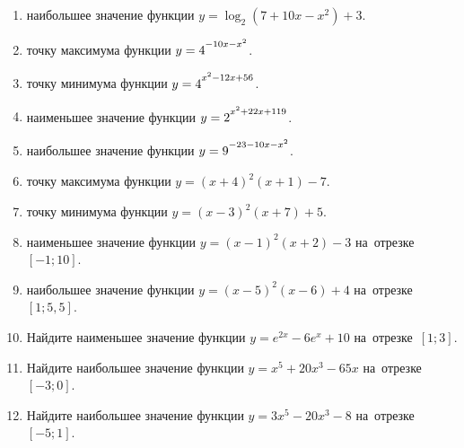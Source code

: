 \documentclass[a4paper,10pt]{article}
\begin{document}
\begin{enumerate}
\item {} наибольшее значение функции $y=\log_2\left(7+10x-x^2\right)+3$.

\item {} точку максимума функции $y=4\strut^{-10x-x^2}$.

\item {} точку минимума функции $y=4\strut^{x^2-12x+56}$.

\item {} наименьшее значение функции $y=2\strut^{x^2+22x+119}$.

\item {} наибольшее значение функции $y=9\strut^{-23-10x-x^2}$.

\item {} точку максимума функции $y=\left(x+4\right)^2\left(x+1\right)-7$.

\item {} точку минимума функции $y=\left(x-3\right)^2\left(x+7\right)+5$.

\item {} наименьшее значение функции $y=\left(x-1\right)^2\left(x+2\right)-3$ на~отрезке~$\left[-1;10\right]$.

\item {} наибольшее значение функции $y=\left(x-5\right)^2\left(x-6\right)+4$ на~отрезке~$\left[1;5{,}5\right]$.

\item Найдите наименьшее значение функции $y=e^{2x}-6e^x+10$ на~отрезке~$\left[1;3\right]$.

\item Найдите наибольшее значение функции $y=x^5+20x^3-65x$ на~отрезке~$\left[-3;0\right]$.

\item Найдите наибольшее значение функции $y=3x^5-20x^3-8$ на~отрезке~$\left[-5;1\right]$.

\end{enumerate}
\end{document}

